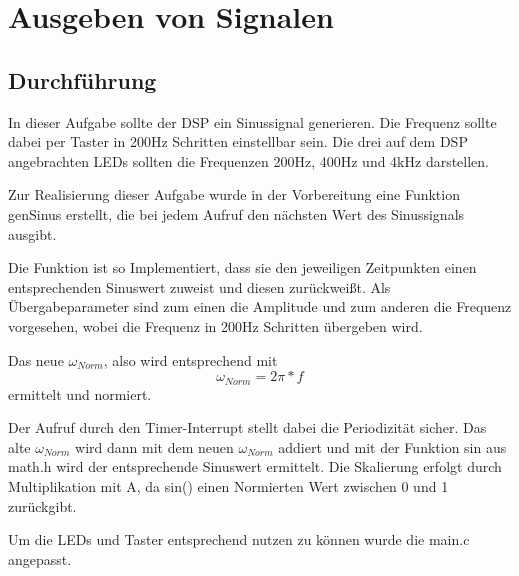 
\chapter{Ausgeben von Signalen}

\section{Durchf\"uhrung}
In dieser Aufgabe sollte der DSP ein Sinussignal generieren. Die Frequenz sollte 
dabei per Taster in 200Hz Schritten einstellbar sein. 
Die drei auf dem DSP angebrachten LEDs sollten die Frequenzen 200Hz, 400Hz und 4kHz darstellen.

Zur Realisierung dieser Aufgabe wurde in der Vorbereitung eine Funktion genSinus erstellt, 
die bei jedem Aufruf den nächsten Wert des Sinussignals ausgibt.

\begin{adjustbox}{width=\textwidth,keepaspectratio}

\end{adjustbox}

Die Funktion ist so Implementiert, dass sie den jeweiligen Zeitpunkten einen entsprechenden Sinuswert zuweist und diesen zurückweißt. 
Als \"Ubergabeparameter sind zum einen die Amplitude und zum anderen die Frequenz vorgesehen, wobei die Frequenz in 200Hz Schritten \"ubergeben wird. 

Das neue \begin{math}\omega_{Norm}\end{math}, also wird entsprechend mit 
\begin{equation}\label{normierteKreisfrequenz}
 \omega_{Norm}=2\pi*f 
\end{equation}  
ermittelt und normiert.\\\par
Der Aufruf durch den Timer-Interrupt stellt dabei die Periodizität sicher. 
Das alte \begin{math}\omega_{Norm}\end{math} wird dann mit dem neuen \begin{math}\omega_{Norm}\end{math} addiert und mit der Funktion sin aus math.h 
wird der entsprechende Sinuswert ermittelt. Die Skalierung erfolgt durch Multiplikation mit A, da sin() einen Normierten Wert zwischen 0 und 1 zurückgibt.

Um die LEDs und Taster entsprechend nutzen zu können wurde die main.c angepasst.
\begin{adjustbox}{width=\textwidth,keepaspectratio}

\end{adjustbox}\pagebreak

